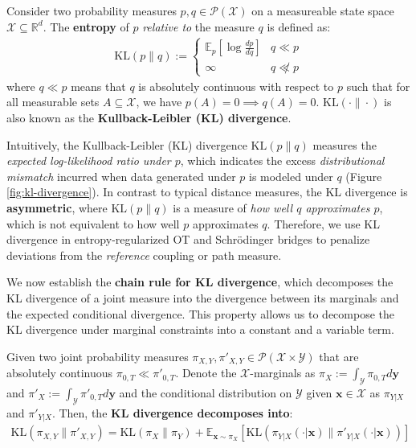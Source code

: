 \documentclass{article}
\newcommand{\boldtext}[1]{\textbf{\textcolor{MyGreen}{#1}}}
\begin{document}
\begin{definition}\label{def:entropy}
    Consider two probability measures $p, q\in \mathcal{P}(\mathcal{X})$ on a measureable state space $\mathcal{X}\subseteq\mathbb{R}^d$. The \textbf{entropy} of $p$ \textit{relative to} the measure $q$ is defined as:
    \begin{align}
        \text{KL}(p\|q):=\begin{cases}
            \mathbb{E}_{p}[\log \frac{dp}{dq}]&q\ll p\\
            \infty &q\not\ll p
        \end{cases}
    \end{align}
    where $q\ll p$ means that $q$ is absolutely continuous with respect to $p$ such that for all measurable sets $A\subseteq \mathcal{X}$, we have $p(A)=0\implies q(A)=0$. $\text{KL}(\cdot\|\cdot)$ is also known as the \textbf{Kullback-Leibler (KL) divergence}.
\end{definition}

Intuitively, the Kullback-Leibler (KL) divergence $\text{KL}(p\|q)$ measures the \textit{expected log-likelihood ratio under $p$}, which indicates the excess \textit{distributional mismatch} incurred when data generated under $p$ is modeled under $q$ (Figure \ref{fig:kl-divergence}). In contrast to typical distance measures, the KL divergence is \textbf{asymmetric}, where $\text{KL}(p\|q)$ is a measure of \textit{how well $q$ approximates $p$}, which is not equivalent to how well $p$ approximates $q$. Therefore, we use KL divergence in entropy-regularized OT and Schrödinger bridges to penalize deviations from the \textit{reference} coupling or path measure. 

We now establish the \boldtext{chain rule for KL divergence}, which decomposes the KL divergence of a joint measure into the divergence between its marginals and the expected conditional divergence. This property allows us to decompose the KL divergence under marginal constraints into a constant and a variable term.

\begin{lemma}\label{lemma:chain-rule-kl}
    Given two joint probability measures $\pi_{X,Y}, \pi'_{X,Y}\in \mathcal{P}(\mathcal{X}\times \mathcal{Y})$ that are absolutely continuous $\pi_{0,T}\ll \pi'_{0,T}$. Denote the $\mathcal{X}$-marginals as $\pi_X:= \int_{\mathcal{Y}}\pi_{0,T}d\boldsymbol{y}$ and $\pi'_X:= \int_{\mathcal{Y}}\pi'_{0,T}d\boldsymbol{y}$ and the conditional distribution on $\mathcal{Y}$ given $\boldsymbol{x}\in \mathcal{X}$ as $\pi_{Y|X}$ and $\pi'_{Y|X}$. Then, the \textbf{KL divergence decomposes into}:
    \begin{align}
        \text{KL}(\pi_{X,Y}\|\pi'_{X,Y})=\text{KL}(\pi_X\|\pi_Y)+\mathbb{E}_{\boldsymbol{x}\sim \pi_X}\left[\text{KL}\left(\pi_{Y|X}(\cdot|\boldsymbol{x})\|\pi'_{Y|X}(\cdot|\boldsymbol{x})\right)\right]\tag{KL Divergence Chain Rule}\label{eq:chain-rule-kl}
    \end{align}
\end{lemma}
\end{document}

